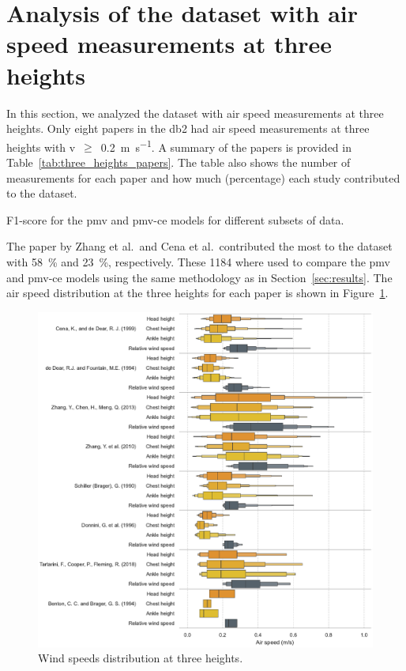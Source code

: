 \appendix

\section{Analysis of the dataset with air speed measurements at three heights}\label{sec:analysis-of-the-dataset-with-air-speed-measurements-at-three-heights}

In this section, we analyzed the dataset with air speed measurements at three heights.
Only eight papers in the \ac{db2} had air speed measurements at three heights with \ac{v}~$\geq$~\qty{0.2}{\m\per\s}.
A summary of the papers is provided in Table~\ref{tab:three_heights_papers}.
The table also shows the number of measurements for each paper and how much (percentage) each study contributed to the dataset.
\begin{table}[htb!]
    \centering
    
    \caption{F1-score for the \ac{pmv} and \ac{pmv-ce} models for different subsets of data.}
    \label{tab:three_heights_papers}
\end{table}
The paper by Zhang et al.\ and Cena et al.\ contributed the most to the dataset with \qty{58}{\percent} and \qty{23}{\percent}, respectively.
These \num{1184} where used to compare the \ac{pmv} and \ac{pmv-ce} models using the same methodology as in Section~\ref{sec:results}.
The air speed distribution at the three heights for each paper is shown in Figure~\ref{fig:boxenplot_wind_speed_three_heights}.
\begin{figure}[htb!]
    \centering
    \includegraphics[width=\textwidth]{figures/boxenplot_wind_speed_three_heights}
    \caption{Wind speeds distribution at three heights.}
    \label{fig:boxenplot_wind_speed_three_heights}
\end{figure}
